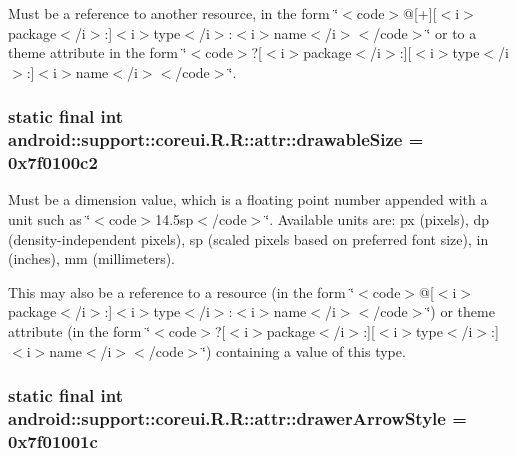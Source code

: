 Must be a reference to another resource, in the form \char`\"{}$<$code$>$@\mbox{[}+\mbox{]}\mbox{[}$<$i$>$package$<$/i$>$:\mbox{]}$<$i$>$type$<$/i$>$:$<$i$>$name$<$/i$>$$<$/code$>$\char`\"{} or to a theme attribute in the form \char`\"{}$<$code$>$?\mbox{[}$<$i$>$package$<$/i$>$:\mbox{]}\mbox{[}$<$i$>$type$<$/i$>$:\mbox{]}$<$i$>$name$<$/i$>$$<$/code$>$\char`\"{}. \hypertarget{classandroid_1_1support_1_1coreui_1_1_r_1_1attr_b6f2bc5fa2139acb5d213f94cda750a6}{
\subsubsection[{drawableSize}]{\setlength{\rightskip}{0pt plus 5cm}static final int android::support::coreui.R.R::attr::drawableSize = 0x7f0100c2}}
\label{classandroid_1_1support_1_1coreui_1_1_r_1_1attr_b6f2bc5fa2139acb5d213f94cda750a6}


Must be a dimension value, which is a floating point number appended with a unit such as \char`\"{}$<$code$>$14.5sp$<$/code$>$\char`\"{}. Available units are: px (pixels), dp (density-independent pixels), sp (scaled pixels based on preferred font size), in (inches), mm (millimeters). 

This may also be a reference to a resource (in the form \char`\"{}$<$code$>$@\mbox{[}$<$i$>$package$<$/i$>$:\mbox{]}$<$i$>$type$<$/i$>$:$<$i$>$name$<$/i$>$$<$/code$>$\char`\"{}) or theme attribute (in the form \char`\"{}$<$code$>$?\mbox{[}$<$i$>$package$<$/i$>$:\mbox{]}\mbox{[}$<$i$>$type$<$/i$>$:\mbox{]}$<$i$>$name$<$/i$>$$<$/code$>$\char`\"{}) containing a value of this type. \hypertarget{classandroid_1_1support_1_1coreui_1_1_r_1_1attr_af99a3072fd04e61ef00561e3d618ddc}{
\subsubsection[{drawerArrowStyle}]{\setlength{\rightskip}{0pt plus 5cm}static final int android::support::coreui.R.R::attr::drawerArrowStyle = 0x7f01001c}}
\label{classandroid_1_1support_1_1coreui_1_1_r_1_1attr_af99a3072fd04e61ef00561e3d618ddc}


